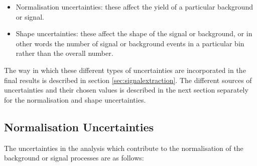 \begin{itemize} 
\item Normalisation uncertainties: these affect the yield of a particular background or
signal.
\item Shape uncertainties: these affect the shape of the signal or background, or in
other words the number of signal or background events in a particular bin rather
than the overall number.
\end{itemize}

The way in which these different types of uncertainties are incorporated in the
final results is described in section \ref{sec:signalextraction}. The different
sources of uncertainties and their chosen values is described in the next
section separately for the normalisation and shape uncertainties.

\subsection{Normalisation Uncertainties}
\label{sec:systematicUncertainties_yield}

The uncertainties in the analysis which contribute to the normalisation of the
background or signal processes are as follows:

